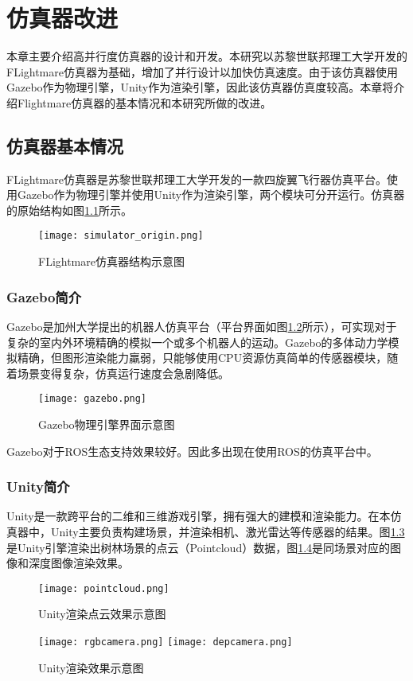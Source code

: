 
\chapter{仿真器改进}
本章主要介绍高并行度仿真器的设计和开发。本研究以苏黎世联邦理工大学开发的FLightmare仿真器为基础，增加了并行设计以加快仿真速度。由于该仿真器使用Gazebo作为物理引擎，Unity作为渲染引擎，因此该仿真器仿真度较高。本章将介绍Flightmare仿真器的基本情况和本研究所做的改进。

\section{仿真器基本情况}
FLightmare仿真器\cite{flightmare}是苏黎世联邦理工大学开发的一款四旋翼飞行器仿真平台。使用Gazebo作为物理引擎并使用Unity作为渲染引擎，两个模块可分开运行。仿真器的原始结构如图\ref{fig_simulator_origin}所示。
\begin{figure}
  \centering
  \texttt{[image: simulator\_origin.png]}
  \caption{FLightmare仿真器结构示意图}
  \label{fig_simulator_origin}
\end{figure}

\subsection{Gazebo简介}
Gazebo是加州大学提出的机器人仿真平台（平台界面如图\ref{fig_gazebo}所示），可实现对于复杂的室内外环境精确的模拟一个或多个机器人的运动。Gazebo的多体动力学模拟精确，但图形渲染能力羸弱，只能够使用CPU资源仿真简单的传感器模块，随着场景变得复杂，仿真运行速度会急剧降低。
\begin{figure}
  \centering
  \texttt{[image: gazebo.png]}
  \label{fig_gazebo}
  \caption{Gazebo物理引擎界面示意图}
\end{figure}
Gazebo对于ROS生态支持效果较好。因此多出现在使用ROS的仿真平台中。

\subsection{Unity简介}
Unity是一款跨平台的二维和三维游戏引擎\cite{unity}，拥有强大的建模和渲染能力。在本仿真器中，Unity主要负责构建场景，并渲染相机、激光雷达等传感器的结果。图\ref{fig_pointcloud}是Unity引擎渲染出树林场景的点云（Pointcloud）数据，图\ref{fig_camera}是同场景对应的图像和深度图像渲染效果。
\begin{figure}
  \centering
  \texttt{[image: pointcloud.png]}
  \caption{Unity渲染点云效果示意图}
  \label{fig_pointcloud}
\end{figure}
\begin{figure}
  \centering  
    {\texttt{[image: rgbcamera.png]}}
    {\texttt{[image: depcamera.png]}}
  \caption{Unity渲染效果示意图}
  \label{fig_camera}
\end{figure}

